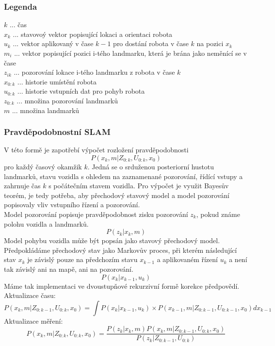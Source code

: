 \documentclass[11pt]{article}
\begin{document}
\subsubsection{Legenda}
$k$ ... čas\\
$x_k$ ... stavovoý vektor popisující lokaci a orientaci robota\\ 
$u_k$ ... vektor aplikovaný v čase $k-1$ pro dostání robota v čase $k$ na pozici $x_k$\\
$m_i$ ... vektor popisující pozici i-tého landmarku, která je brána jako neměnící se v čase\\
$z_{ik}$ ... pozorování lokace i-tého landmarku z robota v čase $k$\\
$x_{0:k}$ ... historie umístění robota\\
$u_{0:k}$ ... historie vstupních dat pro pohyb robota\\
$z_{0:k}$ ... množina pozorování landmarků\\
$m$ ... množina landmarků\\

\subsubsection{Pravděpodobnostní SLAM}
V této formě je zapotřebí výpočet rozložení pravděpodobnosti 
$$P(x_k,m|Z_{0:k},U_{0:k},x_0)$$ 
pro každý časový okamžik ${k}$. Jedná se o srduženou posteriorní hustotu landmarků, stavu vozidla s ohledem na zaznamenané pozorování, řídící vstupy a zahrnuje čas ${k}$ s počátečním stavem vozidla. Pro výpočet je využit Bayesův teorém, je tedy potřeba, aby přechodový stavový model a model pozorování popisovaly vliv vstupního řízení a pozorování.\\
\indent Model pozorování popisuje pravděpodobnost zisku pozorování $z_k$, pokud známe polohu vozidla a landmarků. 
$$P(z_k|x_k,m)$$
\indent Model pohybu vozidla může být popsán jako stavový přechodový model. Předpokládáme přechodový stav jako Markovův proces, při kterém následující stav $x_k$ je závislý pouze na předchozím stavu $x_{k-1}$ a aplikovaném řízení $u_k$ a není tak závislý ani na mapě, ani na pozorování.
$$P(x_k|x_{k-1},u_k)$$
Máme tak implementaci ve dvoustupňové rekurzivní formě korekce předpovědí.\\
Aktualizace času:
$$P(x_k,m|Z_{0:k-1},U_{0:k},x_0)=\int P(x_k|x_{k-1},u_k)\times P(x_{k-1},m|Z_{0:k-1},U_{0:k-1},x_0)dx_{k-1}$$ 
Aktualizace měření:
$$P(x_k,m|Z_{0:k},U_{0:k},x_0)=\frac{P(z_k|x_k,m)P(x_k,m|Z_{0:k-1},U_{0:k},x_0)}{P(z_k|Z_{0:k-1},U_{0:k})}$$
\end{document}

